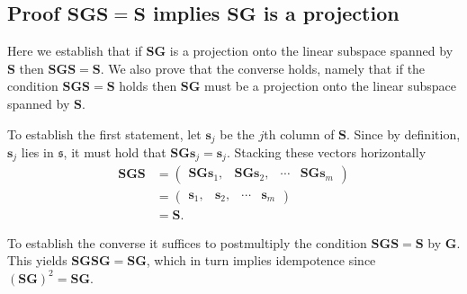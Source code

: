 \documentclass[12pt]{article}
\theoremstyle{definition}
\begin{document}
\subsection{Proof $\bm{S}\bm{G}\bm{S}=\bm{S}$ implies $\bm{S}\bm{G}$ is a projection}\label{app:projection-proof}

Here we establish that if $\bm{S}\bm{G}$ is a projection onto the linear subspace spanned by $\bm{S}$ then $\bm{S}\bm{G}\bm{S}=\bm{S}$. We also prove that the converse holds, namely that if the condition $\bm{S}\bm{G}\bm{S}=\bm{S}$ holds then $\bm{S}\bm{G}$ must be a projection onto the linear subspace spanned by $\bm{S}$.

To establish the first statement, let $\bm{s}_j$ be the $j$th column of $\bm{S}$. Since by definition, $\bm{s}_j$ lies in $\mathfrak{s}$, it must hold that $\bm{S}\bm{G}\bm{s}_j=\bm{s}_j$. Stacking these vectors horizontally
\begin{align*}
\bm{S}\bm{G}\bm{S}
  & = \begin{pmatrix}
        \bm{S}\bm{G}\bm{s}_1, & \bm{S}\bm{G}\bm{s}_2, & \cdots & \bm{S}\bm{G}\bm{s}_m
      \end{pmatrix} \\
  & = \begin{pmatrix}
        \bm{s}_1, & \bm{s}_2, & \cdots & \bm{s}_m
      \end{pmatrix}\\
  & = \bm{S}.
\end{align*}

To establish the converse it suffices to postmultiply the condition $\bm{S}\bm{G}\bm{S}=\bm{S}$ by $\bm{G}$. This yields $\bm{S}\bm{G}\bm{S}\bm{G}=\bm{S}\bm{G}$, which in turn implies idempotence since $(\bm{S}\bm{G})^2=\bm{S}\bm{G}$.


\newpage




\end{document}
